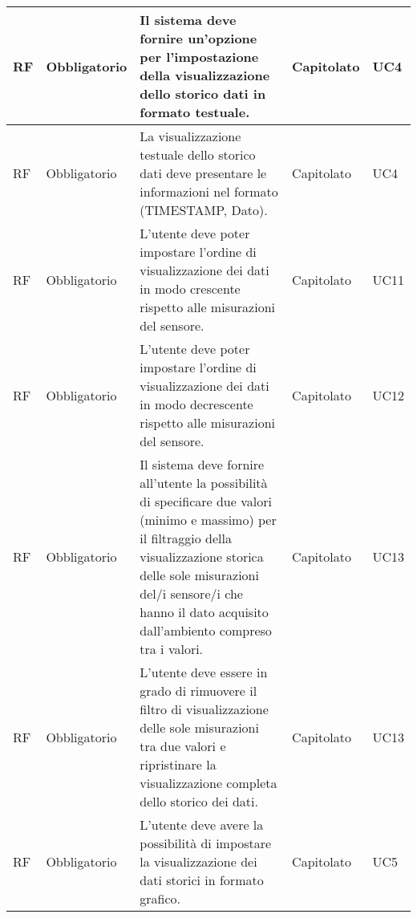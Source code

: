 \begin{longtable}{|C{1cm}|C{2cm}|>{\raggedright}m{5cm}|C{2cm}|C{1.5cm}|}
    \hline

     RF & Obbligatorio        & Il sistema deve fornire un'opzione per l'impostazione della visualizzazione dello storico dati in formato testuale.                                                                                                                & Capitolato      & UC4               \\
    \hline
     RF & Obbligatorio        & La visualizzazione testuale dello storico dati deve presentare le informazioni nel formato (TIMESTAMP, Dato).                                                                                                                      & Capitolato      & UC4               \\
    \hline
     RF & Obbligatorio        & L'utente deve poter impostare l'ordine di visualizzazione dei dati in modo crescente rispetto alle misurazioni del sensore.    & Capitolato      & UC11               \\
    \hline
     RF & Obbligatorio        & L'utente deve poter impostare l'ordine di visualizzazione dei dati in modo decrescente rispetto alle misurazioni del sensore.    & Capitolato      & UC12               \\
    \hline
     RF & Obbligatorio        &  Il sistema deve fornire all'utente la possibilità di specificare due valori (minimo e massimo) per il filtraggio della visualizzazione storica delle sole misurazioni del/i sensore/i che hanno il dato acquisito dall'ambiento compreso tra i valori.       & Capitolato      & UC13               \\
    \hline
     RF & Obbligatorio        &  L'utente deve essere in grado di rimuovere il filtro di visualizzazione delle sole misurazioni tra due valori e ripristinare la visualizzazione completa dello storico dei dati.    & Capitolato      & UC13               \\
    \hline
     RF & Obbligatorio        & L'utente deve avere la possibilità di impostare la visualizzazione dei dati storici in formato grafico.                                                                                                                   & Capitolato      & UC5               \\

\end{longtable}
